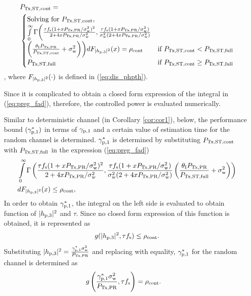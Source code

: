 {\begin{lemma}
\begin{align}
&P_{\text{Tx,ST,cont}} = \nonumber \\ 
& \begin{cases} 
\text{Solving for $P_{\text{Tx,ST,cont}}$, } \\ \int\limits_{0}^{\infty} \Gamma\bigg(\frac{\tau f_{\text{s}} (1 + x P_{\text{Tx,PR}}/\sigma^2_{\text{w}})^2}{2 + 4 x P_{\text{Tx,PR}}/\sigma^2_{\text{w}}}, \frac{\tau f_{\text{s}} (1 + x P_{\text{Tx,PR}}/\sigma^2_{\text{w}})}{\sigma^2_{\text{w}} (2 + 4 x P_{\text{Tx,PR}}/\sigma^2_{\text{w}})} \\ \bigg(\frac{\theta_{\text{I}}P_{\text{Tx,PR}}}{P_{\text{Tx,ST,cont}}}  +  \sigma^2_{\text{w}} \bigg)\bigg) d F_{|h_{\text{p,3}}|^2}(x) = \rho_{\text{cont}} & \mbox{if } P_{\text{Tx,ST,cont}} < P_{\text{Tx,ST,full}} \\
P_{\text{Tx,ST,full}} & \mbox{if } P_{\text{Tx,ST,cont}} \ge P_{\text{Tx,ST,full}}
\end{cases}
\label{eq:preg_fad} 
\end{align}
, where %
$F_{|h_{\text{p,3}}|^2}(\cdot)$ is defined in (\ref{eq:dis_phpth}). 
\end{lemma} 
\begin{IEEEproof}
Since it is complicated to obtain a closed form expression of the integral in (\ref{eq:preg_fad}), therefore, the controlled power is evaluated numerically.  
\end{IEEEproof}
Similar to deterministic channel (in Corollary \ref{cor:cor1}), below, the performance bound $({\gamma}_{\text{p,1}}^*)$ in terms of ${\gamma}_{\text{p,1}}$ and a certain value of estimation time for the random channel is determined.
 ${\gamma}_{\text{p,1}}^*$ is determined by substituting $P_{\text{Tx,ST,cont}}$ with $P_{\text{Tx,ST,full}}$ in the expression (\ref{eq:preg_fad}) 
\begin{align}
&\int\limits_{0}^{\infty} \Gamma\left( \frac{\tau f_{\text{s}} (1 + x P_{\text{Tx,PR}}/\sigma^2_{\text{w}})^2}{2 + 4 x P_{\text{Tx,PR}}/\sigma^2_{\text{w}}}, \frac{\tau f_{\text{s}} (1 + x P_{\text{Tx,PR}}/\sigma^2_{\text{w}})}{\sigma^2_{\text{w}} (2 + 4 x P_{\text{Tx,PR}}/\sigma^2_{\text{w}})}  \left(\frac{\theta_{\text{I}}P_{\text{Tx,PR}}}{P_{\text{Tx,ST,full}}} + \sigma^2_{\text{w}} \right)\right) \nonumber \\ & d F_{|h_{\text{p,3}}|^2}(x) \le \rho_{\text{cont}}, \label{eq:or_fad}
\end{align}
{In order to obtain ${\gamma}_{\text{p,1}}^*$, the integral on the left side is evaluated to obtain function of $|h_{\text{p,3}}|^2$ and $\tau$. Since no closed form expression of this function is obtained, it is represented as}
\begin{align*}
g(|h_{\text{p,3}}|^2, \tau f_{\text{s}}) \le \rho_{\text{cont}}. \nonumber   
\end{align*}
{Substituting $|h_{\text{p,3}}|^2 = \frac{{\gamma}_{\text{p,1}}^* \sigma^2_{\text{w}}}{P_{\text{Tx,PR}}}$ and replacing with equality, ${\gamma}_{\text{p,1}}^*$ for the random channel is determined as} 
\begin{align*}
g\left(\frac{{\gamma}_{\text{p,1}}^* \sigma^2_{\text{w}}}{P_{\text{Tx,PR}}}, \tau f_{\text{s}}\right) &= \rho_{\text{cont}}. \nonumber  
\end{align*}
\begin{figure}[!ht]


\end{figure}}
